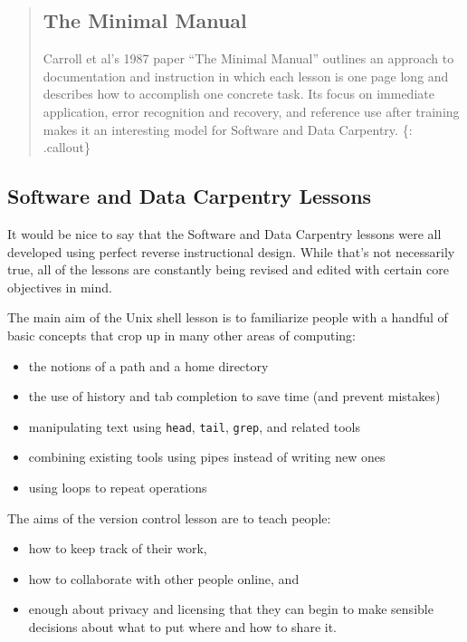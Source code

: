 \begin{quote}
\subsection{The Minimal Manual}\label{the-minimal-manual}

Carroll et al's 1987 paper
``The Minimal Manual'' \cite{bib:carroll-minimal-manual}
outlines an approach to documentation and instruction
in which each lesson is one page long and describes how to accomplish
one concrete task. Its focus on immediate application, error recognition
and recovery, and reference use after training makes it an interesting
model for Software and Data Carpentry. \{: .callout\}
\end{quote}

\subsection{Software and Data Carpentry
Lessons}\label{software-and-data-carpentry-lessons}

It would be nice to say that the Software and Data Carpentry lessons
were all developed using perfect reverse instructional design. While
that's not necessarily true, all of the lessons are constantly being
revised and edited with certain core objectives in mind.

The main aim of the Unix shell lesson is to familiarize people with a
handful of basic concepts that crop up in many other areas of computing:

\begin{itemize}
\itemsep1pt\parskip0pt
\item
  the notions of a path and a home directory
\item
  the use of history and tab completion to save time (and prevent
  mistakes)
\item
  manipulating text using \texttt{head}, \texttt{tail}, \texttt{grep},
  and related tools
\item
  combining existing tools using pipes instead of writing new ones
\item
  using loops to repeat operations
\end{itemize}

The aims of the version control lesson are to teach people:

\begin{itemize}
\itemsep1pt\parskip0pt
\item
  how to keep track of their work,
\item
  how to collaborate with other people online, and
\item
  enough about privacy and licensing that they can begin to make
  sensible decisions about what to put where and how to share it.
\end{itemize}

